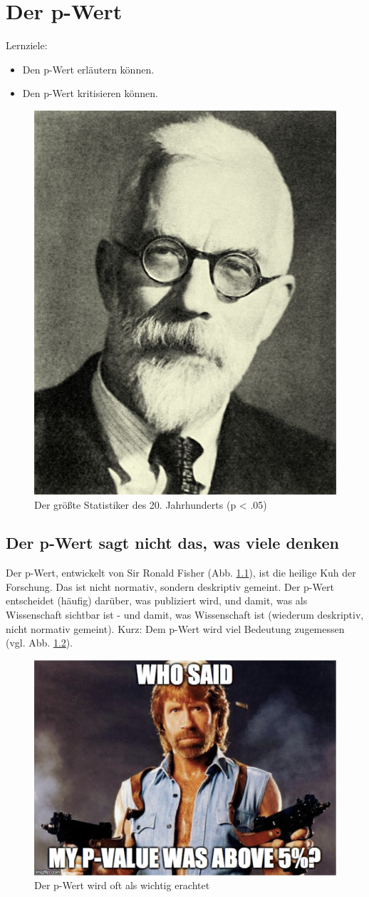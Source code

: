 \documentclass[12pt,ngerman,]{book}
\providecommand{\tightlist}{%
  \setlength{\itemsep}{0pt}\setlength{\parskip}{0pt}}
\let\BeginKnitrBlock\begin \let\EndKnitrBlock\end
\begin{document}
\chapter{Der p-Wert}\label{der-p-wert}

\BeginKnitrBlock{rmdcaution}
Lernziele:

\begin{itemize}
\tightlist
\item
  Den p-Wert erläutern können.
\item
  Den p-Wert kritisieren können.
\end{itemize}
\EndKnitrBlock{rmdcaution}

\begin{figure}

{\centering \includegraphics[width=0.2\linewidth]{images/Ronald_Fisher} 

}

\caption{Der größte Statistiker des 20. Jahrhunderts (p < .05)}\label{fig:sir-fisher}
\end{figure}

\section{Der p-Wert sagt nicht das, was viele
denken}\label{der-p-wert-sagt-nicht-das-was-viele-denken}

Der p-Wert, entwickelt von Sir Ronald Fisher (Abb.
\ref{fig:sir-fisher}), ist die heilige Kuh der Forschung. Das ist nicht
normativ, sondern deskriptiv gemeint. Der p-Wert entscheidet (häufig)
darüber, was publiziert wird, und damit, was als Wissenschaft sichtbar
ist - und damit, was Wissenschaft ist (wiederum deskriptiv, nicht
normativ gemeint). Kurz: Dem p-Wert wird viel Bedeutung zugemessen (vgl.
Abb. \ref{fig:who-said}).

\begin{figure}

{\centering \includegraphics[width=0.35\linewidth]{images/p_value_who_said} 

}

\caption{Der p-Wert wird oft als wichtig erachtet}\label{fig:who-said}
\end{figure}
\end{document}
